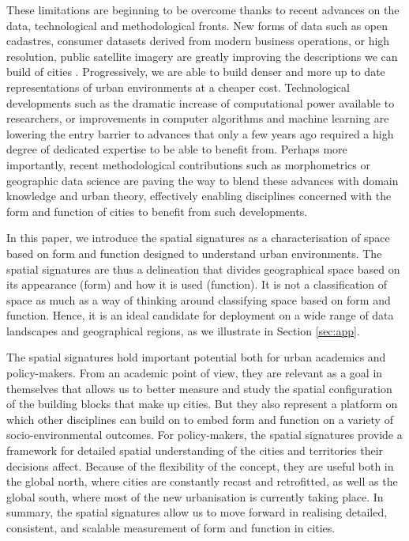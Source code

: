 These limitations are beginning to be overcome thanks to
recent advances on the data, technological and methodological fronts.
New forms of data such as open cadastres, consumer datasets derived from
modern business operations, or high resolution, public satellite imagery are
greatly improving the descriptions we can build of cities
\citep{arribas2014accidental}. Progressively, we are able to build denser and
more up to date representations of urban environments at a cheaper cost.
Technological developments such as the dramatic increase of computational
power available to researchers, or improvements in computer algorithms and machine
learning are lowering the entry barrier to advances that only a few years ago
required a high degree of dedicated expertise to be able to benefit from.
Perhaps more importantly, recent methodological contributions such as
morphometrics \citep{dibble2016urban} or geographic data science
\citep{singleton2021geographic} are paving the way to blend these advances
with domain knowledge and urban theory, effectively enabling disciplines
concerned with the form and function of cities to benefit from such
developments.

In this paper, we introduce the spatial signatures as a characterisation of
space based on form and function designed to understand urban environments.
The spatial signatures are thus a delineation that divides geographical space
based on its appearance (form) and how it is used (function).
It is not a classification of space as much as a way of thinking around
classifying space based on form and function. Hence, it is an ideal candidate
for deployment on a wide range of data landscapes and geographical regions, as
we illustrate in Section \ref{sec:app}.

The spatial signatures hold important potential both for urban academics and
policy-makers.
From an academic point of view, they are relevant as a goal in themselves
that allows us to better measure and study the spatial configuration of the
building blocks that make up cities. But they also represent a platform on
which other disciplines can build on to embed form and function on a variety
of socio-environmental outcomes.
For policy-makers, the spatial signatures provide a framework for detailed
spatial understanding of the cities and territories their decisions affect.
Because of the flexibility of the concept, they are useful both in the global
north, where cities are constantly recast and retrofitted, as well as the
global south, where most of the new urbanisation is currently taking place.
%
In summary, the spatial signatures allow us to move forward in realising
detailed, consistent, and scalable measurement of form and function in
cities.

